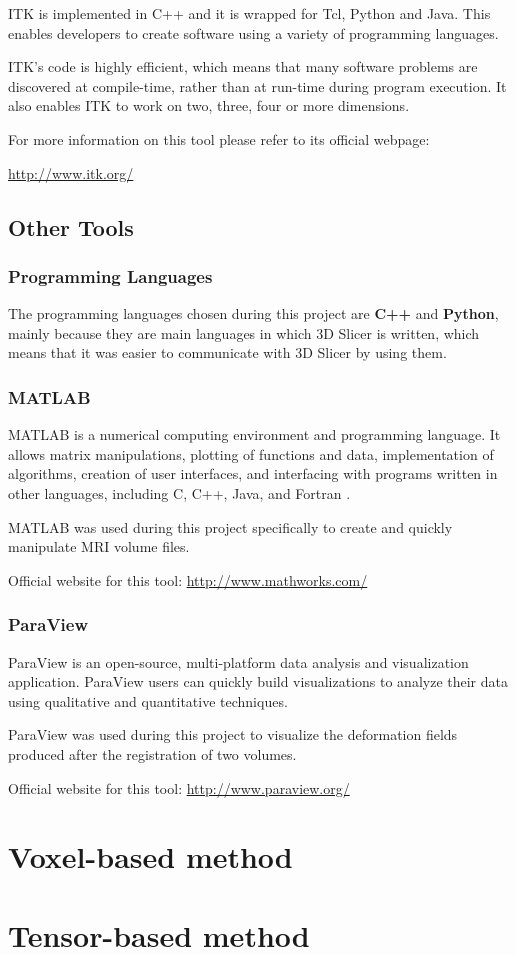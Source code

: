 ITK  is implemented in C++ and it is wrapped for Tcl, Python and Java. This enables developers to create software using a variety of programming languages.

ITK's code is highly efficient, which means that many software problems are discovered at compile-time, rather than at run-time during program execution. It also enables ITK to work on two, three, four or more dimensions.

For more information on this tool please refer to its official webpage: 

\url{http://www.itk.org/}

\subsection{Other Tools}
\subsubsection{Programming Languages}
The programming languages chosen during this project are \textbf{C++} and \textbf{Python}, mainly because they are main languages in which 3D Slicer is written, which means that it was easier to communicate with 3D Slicer by using them.

\subsubsection{MATLAB}
MATLAB is a numerical computing environment and programming language. It allows matrix manipulations, plotting of functions and data, implementation of algorithms, creation of user interfaces, and interfacing with programs written in other languages, including C, C++, Java, and Fortran \cite{matlab}.

MATLAB was used during this project specifically to create and quickly manipulate MRI volume files.

Official website for this tool: \url{http://www.mathworks.com/}

\subsubsection{ParaView}
ParaView is an open-source, multi-platform data analysis and visualization application. ParaView users can quickly build visualizations to analyze their data using qualitative and quantitative techniques.

ParaView was used during this project to visualize the deformation fields produced after the registration of two volumes.

Official website for this tool: \url{http://www.paraview.org/}

\section{Voxel-based method}

\section{Tensor-based method}